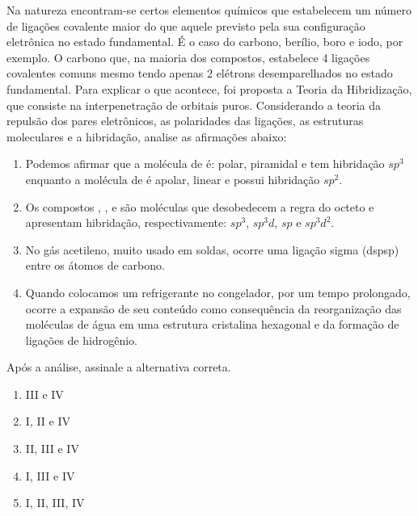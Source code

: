 Na natureza encontram-se certos elementos químicos que estabelecem um número de ligações covalente maior do que aquele previsto pela sua configuração eletrônica no estado fundamental.
É o caso do carbono, berílio, boro e iodo, por exemplo.
O carbono que, na maioria dos compostos, estabelece 4 ligações covalentes comuns mesmo tendo apenas 2 elétrons desemparelhados no estado fundamental.
Para explicar o que acontece, foi proposta a Teoria da Hibridização, que consiste na interpenetração de orbitais puros.
Considerando a teoria da repulsão dos pares eletrônicos, as polaridades das ligações, as estruturas moleculares e a hibridação, analise as afirmações abaixo:

\begin{enumerate}[label = (\Roman*)]
	\item Podemos afirmar que a molécula de  é: polar, piramidal e tem hibridação $sp^3$ enquanto a molécula de  é apolar, linear e possui hibridação $sp^2$.
	\item Os compostos , ,  e  são moléculas que desobedecem a regra do octeto e apresentam hibridação, respectivamente: $sp^3$, $sp^3d$, $sp$ e $sp^3d^2$.
	\item No gás acetileno,  muito usado em soldas, ocorre uma ligação sigma (dspsp) entre os átomos de carbono.
	\item Quando colocamos um refrigerante no congelador, por um tempo prolongado, ocorre a expansão de seu conteúdo como consequência da reorganização das moléculas de água em uma estrutura cristalina hexagonal e da formação de ligações de hidrogênio.
\end{enumerate}

Após a análise, assinale a alternativa correta.

\begin{enumerate}[label = (\alph*), itemjoin={\quad}]
	\item III e IV
	\item I, II e IV
	\item II, III e IV
	\item I, III e IV
	\item I, II, III, IV
\end{enumerate}
